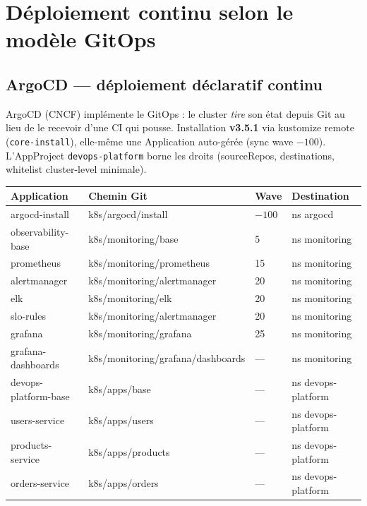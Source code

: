 \documentclass[12pt,a4paper,oneside]{report}
\begin{document}
\clearpage
\chapter[Déploiement continu GitOps]{Déploiement continu selon le modèle GitOps}

\section{ArgoCD --- déploiement déclaratif continu}

ArgoCD (CNCF) implémente le GitOps : le cluster \emph{tire} son état depuis Git au lieu de le recevoir d'une CI qui pousse. Installation \textbf{v3.5.1} via kustomize remote (\texttt{core-install}), elle-même une Application auto-gérée (sync wave $-100$). L'AppProject \texttt{devops-platform} borne les droits (sourceRepos, destinations, whitelist cluster-level minimale).

\begin{center}\label{tab:ch-argocd-douze-applications-cartographie}\end{center}
\begin{longtable}{@{}p{3.4cm}p{5.2cm}p{1.6cm}p{3.4cm}@{}}
\toprule
\textbf{Application} & \textbf{Chemin Git} & \textbf{Wave} & \textbf{Destination} \\
\midrule
\endhead
argocd-install & k8s/argocd/install & $-100$ & ns argocd \\
observability-base & k8s/monitoring/base & 5 & ns monitoring \\
prometheus & k8s/monitoring/prometheus & 15 & ns monitoring \\
alertmanager & k8s/monitoring/alertmanager & 20 & ns monitoring \\
elk & k8s/monitoring/elk & 20 & ns monitoring \\
slo-rules & k8s/monitoring/alertmanager & 20 & ns monitoring \\
grafana & k8s/monitoring/grafana & 25 & ns monitoring \\
grafana-dashboards & k8s/monitoring/grafana/dashboards & --- & ns monitoring \\
devops-platform-base & k8s/apps/base & --- & ns devops-platform \\
users-service & k8s/apps/users & --- & ns devops-platform \\
products-service & k8s/apps/products & --- & ns devops-platform \\
orders-service & k8s/apps/orders & --- & ns devops-platform \\
\bottomrule
\end{longtable}
\end{document}
